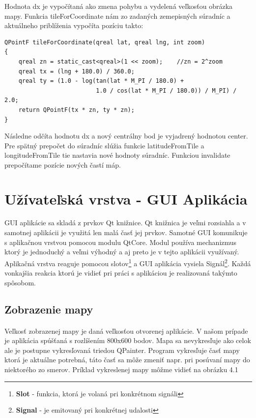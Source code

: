Hodnota dx je vypočítaná ako zmena pohybu a vydelená veľkosťou obrázka mapy. Funkcia tileForCoordinate nám zo zadaných zemepisných súradníc a aktuálneho priblíženia vypočíta pozíciu takto:
\begin{verbatim}
QPointF tileForCoordinate(qreal lat, qreal lng, int zoom)
{
    qreal zn = static_cast<qreal>(1 << zoom);    //zn = 2^zoom
    qreal tx = (lng + 180.0) / 360.0;		 
    qreal ty = (1.0 - log(tan(lat * M_PI / 180.0) +
                          1.0 / cos(lat * M_PI / 180.0)) / M_PI) / 2.0;
    return QPointF(tx * zn, ty * zn);
}
\end{verbatim}

Následne odčíta hodnotu dx a nový centrálny bod je vyjadrený hodnotou center. Pre spätný prepočet do súradníc slúžia funkcie latitudeFromTile a longitudeFromTile tie nastavia nové hodnoty súradníc. Funkciou invalidate prepočítame pozície nových častí máp. 


\section{Užívateľská vrstva - GUI Aplikácia}
\paragraph{}
GUI aplikácie sa skladá z prvkov Qt knižnice. Qt knižnica je veľmi rozsiahla a v samotnej aplikácii je využitá len malá časť jej prvkov. Samotné GUI komunikuje s aplikačnou vrstvou pomocou modulu QtCore. Modul používa mechanizmus ktorý je jednoduchý a veľmi výhodný a aj preto je v tejto aplikácii využívaný. Aplikačná vrstva reaguje pomocou slotov\footnote{\textbf{Slot} - funkcia, ktorá je volaná pri konkrétnom signáli} a GUI aplikácia vysiela Signál\footnote{\textbf{Signal} - je emitovaný pri konkrétnej udalosti}. Každá vonkajšia reakcia ktorú je vidieť pri práci s aplikáciou je realizovaná takýmto spôsobom. 
\subsection{Zobrazenie mapy}
\paragraph{}
Veľkosť zobrazenej mapy je daná veľkosťou otvorenej aplikácie. V našom prípade je aplikácia spúšťaná s rozlíšením 800x600 bodov. Mapa sa nevykresľuje ako celok ale je postupne vykresľovaná triedou QPainter. Program vykresľuje časť mapy ktorá je aktuálne potrebná, táto časť sa môže zmeniť napr. pri posúvaní mapy do niektorého zo smerov. Príklad vykreslenej mapy môžme vidieť na obrázku 4.1

